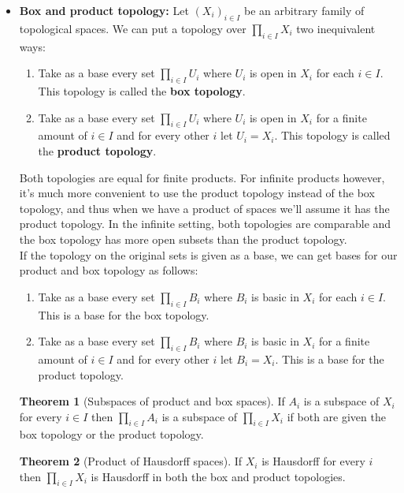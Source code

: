 \documentclass[a4paper]{book}
\theoremstyle{definition}
\newtheorem{theorem}{Theorem}[section]
\theoremstyle{ejemplo}
\theoremstyle{demostracion}
\begin{document}
\begin{itemize}
\item
\textbf{Box and product topology: }Let $(X_{i})_{i\in I}$ be an arbitrary family of topological spaces. We can put a topology over ${\displaystyle \prod_{i\in I}X_{i}}$ two inequivalent ways:
\begin{enumerate}
\item
Take as a base every set ${\displaystyle \prod_{i\in I}U_{i}}$ where $U_{i}$ is open in $X_{i}$ for each $i\in I$. This topology is called the \textbf{box topology}.
\item
Take as a base every set ${\displaystyle \prod_{i\in I}U_{i}}$ where $U_{i}$ is open in $X_{i}$ for a finite amount of $i\in I$ and for every other $i$ let $U_{i}=X_{i}$. This topology is called the \textbf{product topology}.
\end{enumerate}
Both topologies are equal for finite products. For infinite products however, it's much more convenient to use the product topology instead of the box topology, and thus when we have a product of spaces we'll assume it has the product topology. In the infinite setting, both topologies are comparable and the box topology has more open subsets than the product topology.\\
If the topology on the original sets is given as a base, we can get bases for our product and box topology as follows:
\begin{enumerate}
\item
Take as a base every set ${\displaystyle \prod_{i\in I}B_{i}}$ where $B_{i}$ is basic in $X_{i}$ for each $i\in I$. This is a base for the box topology.
\item
Take as a base every set ${\displaystyle \prod_{i\in I}B_{i}}$ where $B_{i}$ is basic in $X_{i}$ for a finite amount of $i\in I$ and for every other $i$ let $B_{i}=X_{i}$. This is a base for the product topology.
\end{enumerate}

\begin{theorem}[Subspaces of product and box spaces]
If $A_{i}$ is a subspace of $X_{i}$ for every $i\in I$ then ${\displaystyle \prod_{i\in I}A_{i} }$ is a subspace of ${\displaystyle \prod_{i\in I}X_{i} }$ if both are given the box topology or the product topology.
\end{theorem}

\begin{theorem}[Product of Hausdorff spaces]
If $X_{i}$ is Hausdorff for every $i$ then ${\displaystyle \prod_{i\in I}X_{i} }$ is Hausdorff in both the box and product topologies.
\end{theorem}


\end{itemize}
\end{document}
